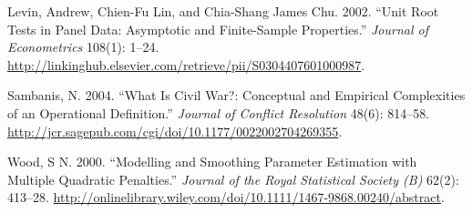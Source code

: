 \documentclass[11pt,article,oneside]{memoir}
\begin{document}
Levin, Andrew, Chien-Fu Lin, and Chia-Shang James Chu. 2002. ``Unit Root
Tests in Panel Data: Asymptotic and Finite-Sample Properties.''
\emph{Journal of Econometrics} 108(1): 1--24.
\url{http://linkinghub.elsevier.com/retrieve/pii/S0304407601000987}.

Sambanis, N. 2004. ``What Is Civil War?: Conceptual and Empirical
Complexities of an Operational Definition.'' \emph{Journal of Conflict
Resolution} 48(6): 814--58.
\url{http://jcr.sagepub.com/cgi/doi/10.1177/0022002704269355}.

Wood, S N. 2000. ``Modelling and Smoothing Parameter Estimation with
Multiple Quadratic Penalties.'' \emph{Journal of the Royal Statistical
Society (B)} 62(2): 413--28.
\url{http://onlinelibrary.wiley.com/doi/10.1111/1467-9868.00240/abstract}.
\end{document}
